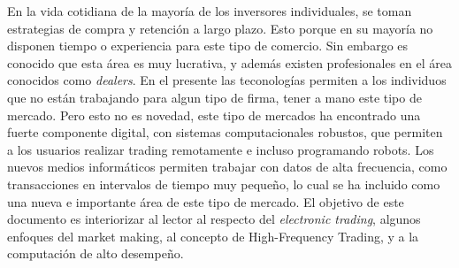 En la vida cotidiana de la mayoría de los inversores individuales, se toman estrategias de compra y retención a largo plazo. Esto porque en su mayoría
no disponen tiempo o experiencia para este tipo de comercio. Sin embargo es conocido que esta área es muy lucrativa, y además existen profesionales en el área
conocidos como \emph{dealers}. En el presente las teconologías permiten a los individuos que no están trabajando para algun tipo de firma, tener a
mano este tipo de mercado. Pero esto no es novedad, este tipo de mercados ha encontrado una fuerte componente digital, con sistemas computacionales robustos,
que permiten a los usuarios realizar trading remotamente e incluso programando robots.
Los nuevos medios informáticos permiten trabajar con datos de alta frecuencia, como transacciones en intervalos de tiempo muy pequeño, lo cual se ha incluido
como una nueva e importante área de este tipo de mercado.
El objetivo de este documento es interiorizar al lector al respecto del \emph{electronic trading}, algunos enfoques del market making, al concepto de High-Frequency
Trading, y a la computación de alto desempeño.
